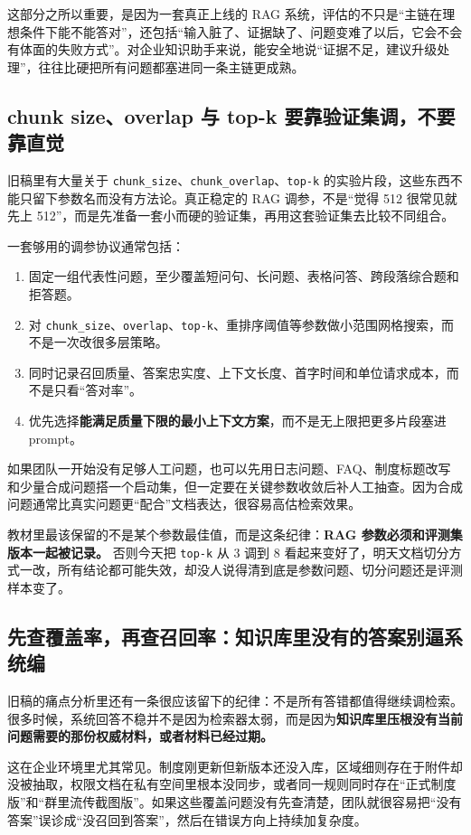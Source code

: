 这部分之所以重要，是因为一套真正上线的 RAG 系统，评估的不只是“主链在理想条件下能不能答对”，还包括“输入脏了、证据缺了、问题变难了以后，它会不会有体面的失败方式”。对企业知识助手来说，能安全地说“证据不足，建议升级处理”，往往比硬把所有问题都塞进同一条主链更成熟。

\subsection{chunk size、overlap 与 top-k 要靠验证集调，不要靠直觉}
旧稿里有大量关于 \texttt{chunk\_size}、\texttt{chunk\_overlap}、\texttt{top-k} 的实验片段，这些东西不能只留下参数名而没有方法论。真正稳定的 RAG 调参，不是“觉得 512 很常见就先上 512”，而是先准备一套小而硬的验证集，再用这套验证集去比较不同组合。

一套够用的调参协议通常包括：
\begin{enumerate}
  \item 固定一组代表性问题，至少覆盖短问句、长问题、表格问答、跨段落综合题和拒答题。
  \item 对 \texttt{chunk\_size}、\texttt{overlap}、\texttt{top-k}、重排序阈值等参数做小范围网格搜索，而不是一次改很多层策略。
  \item 同时记录召回质量、答案忠实度、上下文长度、首字时间和单位请求成本，而不是只看“答对率”。
  \item 优先选择\textbf{能满足质量下限的最小上下文方案}，而不是无上限把更多片段塞进 prompt。
\end{enumerate}

如果团队一开始没有足够人工问题，也可以先用日志问题、FAQ、制度标题改写和少量合成问题搭一个启动集，但一定要在关键参数收敛后补人工抽查。因为合成问题通常比真实问题更“配合”文档表达，很容易高估检索效果。

教材里最该保留的不是某个参数最佳值，而是这条纪律：\textbf{RAG 参数必须和评测集版本一起被记录。} 否则今天把 \texttt{top-k} 从 3 调到 8 看起来变好了，明天文档切分方式一改，所有结论都可能失效，却没人说得清到底是参数问题、切分问题还是评测样本变了。

\subsection{先查覆盖率，再查召回率：知识库里没有的答案别逼系统编}
旧稿的痛点分析里还有一条很应该留下的纪律：不是所有答错都值得继续调检索。很多时候，系统回答不稳并不是因为检索器太弱，而是因为\textbf{知识库里压根没有当前问题需要的那份权威材料，或者材料已经过期。}

这在企业环境里尤其常见。制度刚更新但新版本还没入库，区域细则存在于附件却没被抽取，权限文档在私有空间里根本没同步，或者同一规则同时存在“正式制度版”和“群里流传截图版”。如果这些覆盖问题没有先查清楚，团队就很容易把“没有答案”误诊成“没召回到答案”，然后在错误方向上持续加复杂度。

